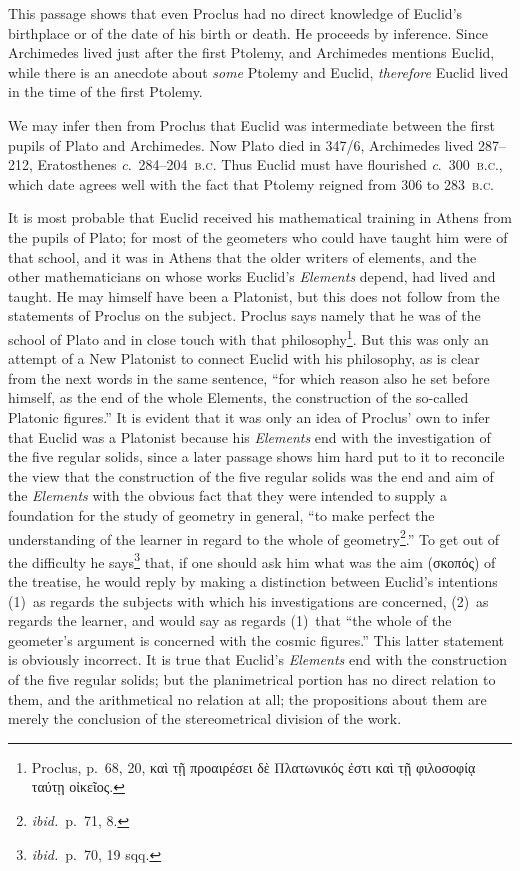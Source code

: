 This passage shows that even Proclus had no direct knowledge of Euclid's birthplace or of the date of his birth or death. He proceeds by inference. Since Archimedes lived just after the first Ptolemy, and Archimedes mentions Euclid, while there is an anecdote about \emph{some} Ptolemy and Euclid, \emph{therefore} Euclid lived in the time of the first Ptolemy.

We may infer then from Proclus that Euclid was intermediate between the first pupils of Plato and Archimedes. Now Plato died in 347/6, Archimedes lived 287--212, Eratosthenes \emph{c}.~284--204~\textsc{b.c.} Thus Euclid must have flourished \emph{c}.~300~\textsc{b.c.}, which date agrees well with the fact that Ptolemy reigned from 306 to 283~\textsc{b.c.}

It is most probable that Euclid received his mathematical training in Athens from the pupils of Plato; for most of the geometers who could have taught him were of that school, and it was in Athens that the older writers of elements, and the other mathematicians on whose works Euclid's \emph{Elements} depend, had lived and taught. He may himself have been a Platonist, but this does not follow from the statements of Proclus on the subject. Proclus says namely that he was of the school of Plato and in close touch with that philosophy\footnote{Proclus, p.~68, 20, καὶ τῇ προαιρέσει δὲ Πλατωνικός ἐστι καὶ τῇ φιλοσοφίᾳ ταύτῃ οἰκεῖος.}. But this was only an attempt of a New Platonist to connect Euclid with his philosophy, as is clear from the next words in the same sentence, ``for which reason also he set before himself, as the end of the whole Elements, the construction of the so-called Platonic figures.'' It is evident that it was only an idea of Proclus' own to infer that Euclid was a Platonist because his \emph{Elements} end with the investigation of the five regular solids, since a later passage shows him hard put to it to reconcile the view that the construction of the five regular solids was the end and aim of the \emph{Elements} with the obvious fact that they were intended to supply a foundation for the study of geometry in general, ``to make perfect the understanding of the learner in regard to the whole of geometry\footnote{\emph{ibid.}\ p.~71, 8.}.'' To get out of the difficulty he says\footnote{\emph{ibid.}\ p.~70, 19 sqq.} that, if one should ask him what was the aim (σκοπός) of the treatise, he would reply by making a distinction between Euclid's intentions (1)~as regards the subjects with which his investigations are concerned, (2)~as regards the learner, and would say as regards (1)~that ``the whole of the geometer's argument is concerned with the cosmic figures.'' This latter statement is obviously incorrect. It is true that Euclid's \emph{Elements} end with the construction of the five regular solids; but the planimetrical portion has no direct relation to them, and the arithmetical no relation at all; the propositions about them are merely the conclusion of the stereometrical division of the work.


